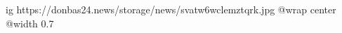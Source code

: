  
 
 
 
 

\ifcmt
  ig https://donbas24.news/storage/news/svatw6wclemztqrk.jpg
  @wrap center
  @width 0.7
\fi
